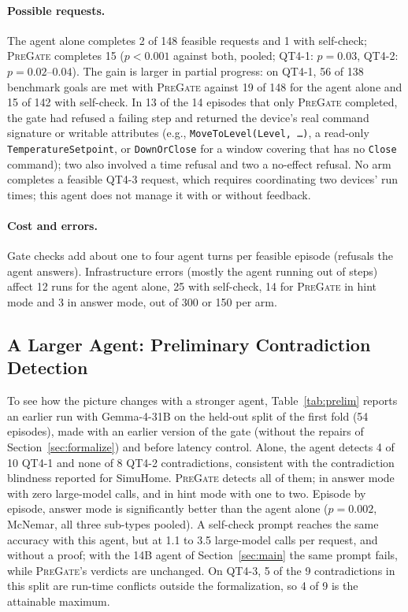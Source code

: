 \documentclass[sigconf]{aamas}
\newcommand{\sys}{\textsc{PreGate}}
\begin{document}
\paragraph{Possible requests.} The agent alone completes 2 of 148 feasible requests and 1 with self-check;
\sys{} completes 15 ($p<0.001$ against both, pooled; QT4-1: $p=0.03$, QT4-2: $p=0.02$--$0.04$). The gain is larger in partial progress: on QT4-1, 56 of 138 benchmark goals are met
with \sys{} against 19 of 148 for the agent alone and 15 of 142 with self-check. In 13 of the 14 episodes that
only \sys{} completed, the gate had refused a failing step and returned the device's real command signature or
writable attributes (e.g., \texttt{MoveToLevel(Level, \dots)}, a read-only \texttt{TemperatureSetpoint}, or
\texttt{DownOrClose} for a window covering that has no \texttt{Close} command); two also involved a time
refusal and two a no-effect refusal. No arm completes a feasible QT4-3 request, which requires coordinating two
devices' run times; this agent does not manage it with or without feedback.

\paragraph{Cost and errors.} Gate checks add about one to four agent turns per feasible episode (refusals the
agent answers). Infrastructure errors (mostly the agent running out of steps) affect 12 runs for the agent
alone, 25 with self-check, 14 for \sys{} in hint mode and 3 in answer mode, out of 300 or 150 per arm.

\subsection{A Larger Agent: Preliminary Contradiction Detection}

To see how the picture changes with a stronger agent, Table~\ref{tab:prelim} reports an earlier run with
Gemma-4-31B on the held-out split of the first fold (54 episodes), made with an earlier version of the gate
(without the repairs of Section~\ref{sec:formalize}) and before latency control. Alone, the
agent detects 4 of 10 QT4-1 and none of 8 QT4-2 contradictions, consistent with the contradiction blindness
reported for SimuHome. \sys{} detects all of them; in answer mode with zero large-model calls, and in hint mode
with one to two. Episode by episode, answer mode is significantly better than the agent alone
($p=0.002$, McNemar, all three sub-types pooled). A self-check prompt reaches the same accuracy with this agent,
but at 1.1 to 3.5 large-model calls per request, and without a proof; with the 14B agent of
Section~\ref{sec:main} the same prompt fails, while \sys{}'s verdicts are unchanged. On QT4-3, 5 of the 9 contradictions in this
split are run-time conflicts outside the formalization, so 4 of 9 is the attainable maximum.
\end{document}
